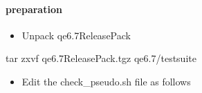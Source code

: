 \documentclass[a4paper,12pt,english]{sphinxmanual}
\begin{document}
\paragraph{preparation}
\label{\detokenize{compile/Quantum-ESPRESSO_6.7:preparation}}\begin{itemize}
\item {} 
\sphinxAtStartPar
Unpack qe\sphinxhyphen{}6.7\sphinxhyphen{}ReleasePack

\end{itemize}

\begin{sphinxVerbatim}[commandchars=\\\{\}]
tar zxvf qe\PYGZhy{}6.7\PYGZhy{}ReleasePack.tgz   qe\PYGZhy{}6.7/test\PYGZhy{}suite
\end{sphinxVerbatim}
\begin{itemize}
\item {} 
\sphinxAtStartPar
Edit the check\_pseudo.sh file as follows

\end{itemize}
\end{document}
